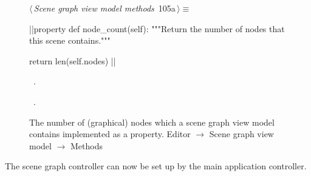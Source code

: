 \documentclass[%
    a4paper,    %
    justified,  %
    nobib,      %
    openany     %
]{tufte-book}
\makeatletter
\renewcommand{\label}[1]{\@tufte@label{##1}}%
\makeatother
\begin{document}
\begin{figure}[!htbp]
\begin{flushleft} \small
\begin{minipage}{\linewidth}\label{scrap37}\raggedright\small
{} $\langle\,${\itshape Scene graph view model methods}\nobreak\ {\footnotesize {105a}}$\,\rangle\equiv$
\vspace{-1ex}
\begin{pythoncode}
|\normalfont{}\fontfamily{}|property
def node_count(self):
    """Return the number of nodes that this scene contains."""

    return len(self.nodes)
|\NWsep|
\end{pythoncode}
\vspace{1.5ex}
\footnotesize
\begin{list}{}{\setlength{\itemsep}{-\parsep}\setlength{\itemindent}{-\leftmargin}}
\item \NWtxtMacroDefBy\ .
\item \NWtxtMacroRefIn\ .

\item{}
\end{list}
\end{minipage}\vspace{4ex}
\end{flushleft}
\caption{The number of (graphical) nodes which a scene graph view model contains
  implemented as a property.
  \newline{}\newline{}Editor $\rightarrow$ Scene graph view model $\rightarrow$
  Methods}
\end{figure}

The scene graph controller can now be set up by the main application controller.
\end{document}
